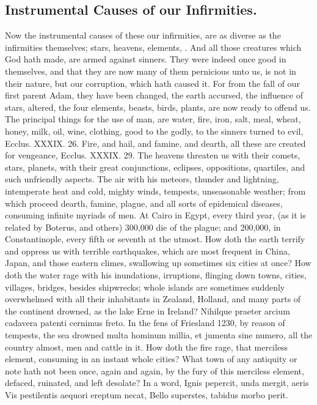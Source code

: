 {\subsection{Instrumental Causes of our Infirmities.}
Now the instrumental causes
of these our infirmities, are as diverse as the infirmities themselves;
stars, heavens, elements, \etc{}. And all those creatures which God hath
made, are armed against sinners. They were indeed once good in
themselves, and that they are now many of them pernicious unto us, is
not in their nature, but our corruption, which hath caused it. For from
the fall of our first parent Adam, they have been changed, the earth
accursed, the influence of stars, altered, the four elements, beasts,
birds, plants, are now ready to offend us. The principal things for the
use of man, are water, fire, iron, salt, meal, wheat, honey, milk, oil,
wine, clothing, good to the godly, to the sinners turned to evil,
Ecclus. XXXIX. 26. Fire, and hail, and famine, and dearth, all these
are created for vengeance, Ecclus. XXXIX. 29. The heavens threaten us
with their comets, stars, planets, with their great conjunctions,
eclipses, oppositions, quartiles, and such unfriendly aspects. The air
with his meteors, thunder and lightning, intemperate heat and cold,
mighty winds, tempests, unseasonable weather; from which proceed
dearth, famine, plague, and all sorts of epidemical diseases, consuming
infinite myriads of men. At Cairo in Egypt, every third year, (as it is
related by Boterus, and others) 300,000 die of the plague; and
200,000, in Constantinople, every fifth or seventh at the utmost. How
doth the earth terrify and oppress us with terrible earthquakes, which
are most frequent in China, Japan, and those eastern climes,
swallowing up sometimes six cities at once? How doth the water rage
with his inundations, irruptions, flinging down towns, cities,
villages, bridges, \etc{} besides shipwrecks; whole islands are sometimes
suddenly overwhelmed with all their inhabitants in Zealand,
Holland, and many parts of the continent drowned, as the lake Erne
in Ireland? Nihilque praeter arcium cadavera patenti cernimus
freto. In the fens of Friesland 1230, by reason of tempests, the
sea drowned multa hominum millia, et jumenta sine numero, all the
country almost, men and cattle in it. How doth the fire rage, that
merciless element, consuming in an instant whole cities? What town of
any antiquity or note hath not been once, again and again, by the fury
of this merciless element, defaced, ruinated, and left desolate? In a
word,
Ignis pepercit, unda mergit, aeris
Vis pestilentis aequori ereptum necat,
Bello superstes, tabidus morbo perit.

}
